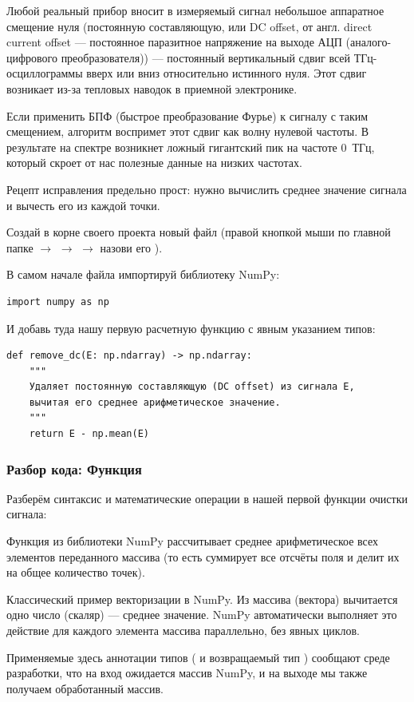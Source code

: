 Любой реальный прибор вносит в измеряемый сигнал небольшое аппаратное смещение нуля (постоянную составляющую, или DC offset, от англ. direct current offset --- постоянное паразитное напряжение на выходе АЦП (аналого-цифрового преобразователя)) — постоянный вертикальный сдвиг всей ТГц-осциллограммы вверх или вниз относительно истинного нуля. Этот сдвиг возникает из-за тепловых наводок в приемной электронике.

Если применить БПФ (быстрое преобразование Фурье) к сигналу с таким смещением, алгоритм воспримет этот сдвиг как волну нулевой частоты. В результате на спектре возникнет ложный гигантский пик на частоте $0$~ТГц, который скроет от нас полезные данные на низких частотах.

Рецепт исправления предельно прост: нужно вычислить среднее значение сигнала и вычесть его из каждой точки. 

Создай в корне своего проекта новый файл  (правой кнопкой мыши по главной папке $\rightarrow$  $\rightarrow$  $\rightarrow$ назови его ).

В самом начале файла импортируй библиотеку NumPy:
\begin{verbatim}
import numpy as np
\end{verbatim}

И добавь туда нашу первую расчетную функцию с явным указанием типов:
\begin{verbatim}
def remove_dc(E: np.ndarray) -> np.ndarray:
    """
    Удаляет постоянную составляющую (DC offset) из сигнала E,
    вычитая его среднее арифметическое значение.
    """
    return E - np.mean(E)
\end{verbatim}

\subsubsection{Разбор кода: Функция }

Разберём синтаксис и математические операции в нашей первой функции очистки сигнала:
\begin{syntaxdesc}
    \item[Вычисление среднего значения \mycode{np.mean(E)}] Функция из библиотеки NumPy рассчитывает среднее арифметическое всех элементов переданного массива  (то есть суммирует все отсчёты поля и делит их на общее количество точек).
    \item[Векторизованное вычитание \mycode{E - np.mean(E)}] Классический пример векторизации в NumPy. Из массива (вектора) вычитается одно число (скаляр) --- среднее значение. NumPy автоматически выполняет это действие для каждого элемента массива параллельно, без явных циклов.
\end{syntaxdesc}
Применяемые здесь аннотации типов ( и возвращаемый тип ) сообщают среде разработки, что на вход ожидается массив NumPy, и на выходе мы также получаем обработанный массив.

